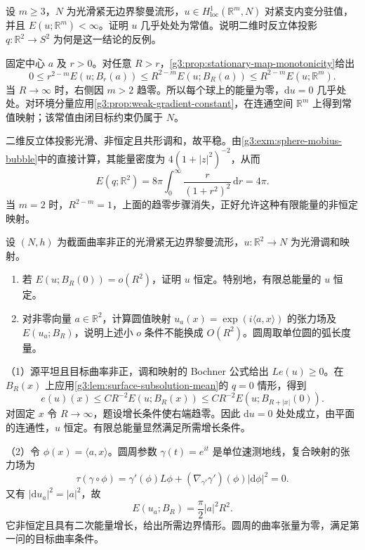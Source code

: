 \begin{exercise}\label{g3:ex:stationary-finite-energy-liouville}
	设 \(m\ge3\)，\(N\) 为光滑紧无边界黎曼流形，\(u\in H^1_{\mathrm{loc}}(\mathbb R^m,N)\) 对紧支内变分驻值，并且 \(E(u;\mathbb R^m)<\infty\)。证明 \(u\) 几乎处处为常值。说明二维时反立体投影 \(q:\mathbb R^2\to S^2\) 为何是这一结论的反例。
\end{exercise}
\begin{solution}
	固定中心 \(a\) 及 \(r>0\)。对任意 \(R>r\)，\cref{g3:prop:stationary-map-monotonicity}给出
	\[
		0\le r^{2-m}E(u;B_r(a))
		\le R^{2-m}E(u;B_R(a))
		\le R^{2-m}E(u;\mathbb R^m).
	\]
	当 \(R\to\infty\) 时，右侧因 \(m>2\) 趋零。所以每个球上的能量为零，\(\mathrm du=0\) 几乎处处。对环境分量应用\cref{g3:prop:weak-gradient-constant}，在连通空间 \(\mathbb R^m\) 上得到常值映射；该常值由闭目标约束仍属于 \(N\)。

	二维反立体投影光滑、非恒定且共形调和，故平稳。由\cref{g3:exm:sphere-mobius-bubble}中的直接计算，其能量密度为 \(4(1+|z|^2)^{-2}\)，从而
	\[
		E(q;\mathbb R^2)=8\pi\int_0^\infty\frac{r}{(1+r^2)^2}\,\mathrm dr=4\pi.
	\]
	当 \(m=2\) 时，\(R^{2-m}=1\)，上面的趋零步骤消失，正好允许这种有限能量的非恒定映射。
\end{solution}

\begin{exercise}\label{g3:ex:harmonic-map-plane-liouville}
	设 \((N,h)\) 为截面曲率非正的光滑紧无边界黎曼流形，\(u:\mathbb R^2\to N\) 为光滑调和映射。
	\begin{enumerate}
		\item 若 \(E(u;B_R(0))=o(R^2)\)，证明 \(u\) 恒定。特别地，有限总能量的 \(u\) 恒定。
		\item 对非零向量 \(a\in\mathbb R^2\)，计算圆值映射 \(u_a(x)=\exp(i\langle a,x\rangle)\) 的张力场及 \(E(u_a;B_R)\)，说明上述小 \(o\) 条件不能换成 \(O(R^2)\)。圆周取单位圆的弧长度量。
	\end{enumerate}
\end{exercise}
\begin{solution}
	（1）源平坦且目标曲率非正，调和映射的 Bochner 公式给出 \(L e(u)\ge0\)。在 \(B_R(x)\) 上应用\cref{g3:lem:surface-subsolution-mean}的 \(q=0\) 情形，得到
	\[
		e(u)(x)\le CR^{-2}E(u;B_R(x))
		\le CR^{-2}E(u;B_{R+|x|}(0)).
	\]
	对固定 \(x\) 令 \(R\to\infty\)，题设增长条件使右端趋零。因此 \(\mathrm du=0\) 处处成立，由平面的连通性，\(u\) 恒定。有限总能量显然满足所需增长条件。

	（2）令 \(\phi(x)=\langle a,x\rangle\)。圆周参数 \(\gamma(t)=e^{it}\) 是单位速测地线，复合映射的张力场为
	\[
		\tau(\gamma\circ\phi)
		=\gamma'(\phi)L\phi
		+(\nabla_{\gamma'}\gamma')(\phi)|\mathrm d\phi|^2=0.
	\]
	又有 \(|\mathrm du_a|^2=|a|^2\)，故
	\[
		E(u_a;B_R)=\frac{\pi}{2}|a|^2R^2.
	\]
	它非恒定且具有二次能量增长，给出所需边界情形。圆周的曲率张量为零，满足第一问的目标曲率条件。
\end{solution}

